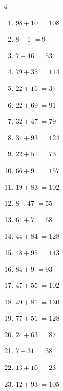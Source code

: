 \begin{multicols}{4}
\begin{enumerate}
  \item $98+10$
        $=108$

  \item $8+1$
        $=9$

  \item $7+46$
        $=53$

  \item $79+35$
        $=114$

  \item $22+15$
        $=37$

  \item $22+69$
        $=91$

  \item $32+47$
        $=79$

  \item $31+93$
        $=124$

  \item $22+51$
        $=73$

  \item $66+91$
        $=157$

  \item $19+83$
        $=102$

  \item $8+47$
        $=55$

  \item $61+7$
        $=68$

  \item $44+84$
        $=128$

  \item $48+95$
        $=143$

  \item $84+9$
        $=93$

  \item $47+55$
        $=102$

  \item $49+81$
        $=130$

  \item $77+51$
        $=128$

\columnbreak %

  \item $24+63$
        $=87$

  \item $7+31$
        $=38$

  \item $13+10$
        $=23$

  \item $12+93$
        $=105$


\end{enumerate}
\end{multicols}
